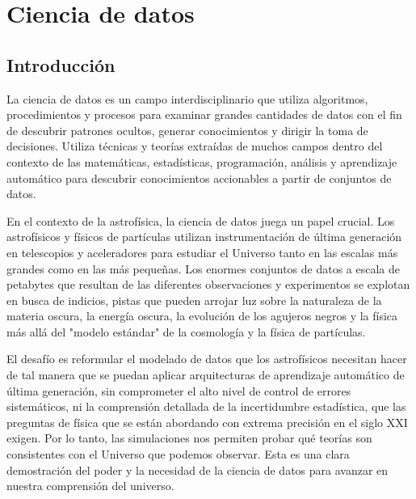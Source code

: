 
\chapter{Ciencia de datos}\label{ch:octavo-capitulo}
\section{Introducción}
La ciencia de datos es un campo interdisciplinario que utiliza algoritmos, procedimientos y procesos para examinar grandes cantidades de datos con el fin de descubrir patrones ocultos, generar conocimientos y dirigir la toma de decisiones. Utiliza técnicas y teorías extraídas de muchos campos dentro del contexto de las matemáticas, estadísticas, programación, análisis y aprendizaje automático para descubrir conocimientos accionables a partir de conjuntos de datos.\par

En el contexto de la astrofísica, la ciencia de datos juega un papel crucial. Los astrofísicos y físicos de partículas utilizan instrumentación de última generación en telescopios y aceleradores para estudiar el Universo tanto en las escalas más grandes como en las más pequeñas. Los enormes conjuntos de datos a escala de petabytes que resultan de las diferentes observaciones y experimentos se explotan en busca de indicios, pistas que pueden arrojar luz sobre la naturaleza de la materia oscura, la energía oscura, la evolución de los agujeros negros y la física más allá del "modelo estándar" de la cosmología y la física de partículas.\par

El desafío es reformular el modelado de datos que los astrofísicos necesitan hacer de tal manera que se puedan aplicar arquitecturas de aprendizaje automático de última generación, sin comprometer el alto nivel de control de errores sistemáticos, ni la comprensión detallada de la incertidumbre estadística, que las preguntas de física que se están abordando con extrema precisión en el siglo XXI exigen. Por lo tanto, las simulaciones nos permiten probar qué teorías son consistentes con el Universo que podemos observar. Esta es una clara demostración del poder y la necesidad de la ciencia de datos para avanzar en nuestra comprensión del universo.\par


